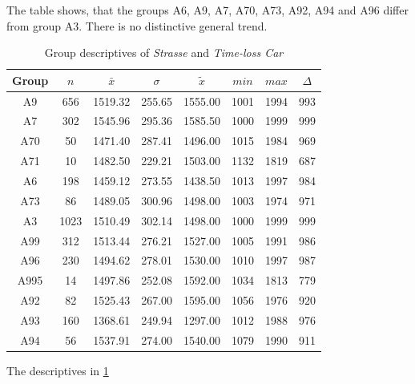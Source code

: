 The table shows, that the groups A6, A9, A7, A70, A73, A92, A94 and A96 differ from group A3. There is no distinctive general trend.
\begin{table}[ht!]
	\tiny
	\centering
	\begin{tabular}{c|c|c|c|c|c|c|c}
		\toprule
		Group & $n$ & $\bar{x}$ & $\sigma$ & $\tilde{x}$ & $min$ & $max$ & $\Delta$ \\
		\midrule
		A9   & 656  & 1519.32 & 255.65 & 1555.00 & 1001 & 1994 & 993 \\ 
		A7   & 302  & 1545.96 & 295.36 & 1585.50 & 1000 & 1999 & 999 \\ 
		A70  & 50   & 1471.40 & 287.41 & 1496.00 & 1015 & 1984 & 969 \\ 
		A71  & 10   & 1482.50 & 229.21 & 1503.00 & 1132 & 1819 & 687 \\ 
		A6   & 198  & 1459.12 & 273.55 & 1438.50 & 1013 & 1997 & 984 \\ 
		A73  & 86   & 1489.05 & 300.96 & 1498.00 & 1003 & 1974 & 971 \\ 
		A3   & 1023 & 1510.49 & 302.14 & 1498.00 & 1000 & 1999 & 999 \\ 
		A99  & 312  & 1513.44 & 276.21 & 1527.00 & 1005 & 1991 & 986 \\ 
		A96  & 230  & 1494.62 & 278.01 & 1530.00 & 1010 & 1997 & 987 \\ 
		A995 & 14   & 1497.86 & 252.08 & 1592.00 & 1034 & 1813 & 779 \\ 
		A92  & 82   & 1525.43 & 267.00 & 1595.00 & 1056 & 1976 & 920 \\ 
		A93  & 160  & 1368.61 & 249.94 & 1297.00 & 1012 & 1988 & 976 \\ 
		A94  & 56   & 1537.91 & 274.00 & 1540.00 & 1079 & 1990 & 911 \\ 
		\bottomrule
	\end{tabular}
	\caption{Group descriptives of \textit{Strasse} and \textit{Time-loss Car}}
	\label{tbl:descriptives_arbis_matched_Strasse_TLCar}
\end{table}
The descriptives in \cref{tbl:descriptives_arbis_matched_Strasse_TLCar}

